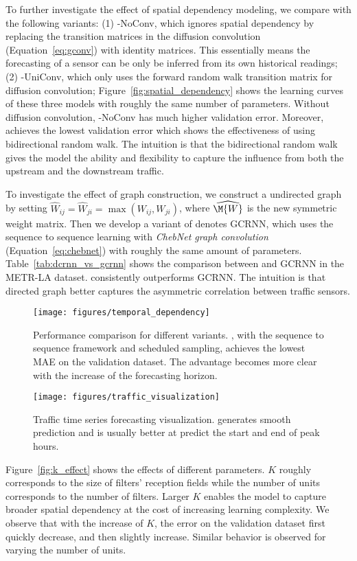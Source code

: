 To further investigate the effect of spatial dependency modeling, we compare \gcrnn{} with the following variants:
(1) \gcrnn{}-NoConv, which ignores spatial dependency by replacing the transition matrices in the diffusion convolution (Equation~\ref{eq:gconv}) with identity matrices. This essentially means the forecasting of a sensor can be only be inferred from its own historical readings;
(2) \gcrnn{}-UniConv, which only uses the forward random walk transition matrix for diffusion convolution;
Figure~\ref{fig:spatial_dependency} shows the learning curves of these three models with roughly the same number of parameters.
Without diffusion convolution, \gcrnn{}-NoConv has much higher validation error. Moreover, \gcrnn{} achieves the lowest validation error which shows the effectiveness of using bidirectional random walk.
The intuition is that the bidirectional random walk gives the model the ability and flexibility to capture the influence from both the upstream and the downstream traffic.

To investigate the effect of graph construction, we construct a undirected graph by setting $\widehat{W}_{ij} = \widehat{W}_{ji} = \max(W_{ij}, W_{ji})$, where $\widehat{\M{W}}$ is the new symmetric weight matrix.
Then we develop a variant of \gcrnn{} denotes GCRNN, which uses the sequence to sequence learning with \emph{ChebNet graph convolution} (Equation~\ref{eq:chebnet}) with roughly the same amount of parameters.
Table~\ref{tab:dcrnn_vs_gcrnn} shows the comparison between \gcrnn{} and GCRNN in the METR-LA dataset.
\gcrnn{} consistently outperforms GCRNN. The intuition is that directed graph better captures the asymmetric correlation between traffic sensors.  
\begin{figure*}[tp]
    \centering
	\begin{minipage}{.43\textwidth}
	\centering
\texttt{[image: figures/temporal\_dependency]}
    \caption{Performance comparison for different \gcrnn{} variants. \gcrnn{}, with the sequence to sequence framework and scheduled sampling, achieves the lowest MAE on the validation dataset. The advantage becomes more clear with the increase of the forecasting horizon.}
    \label{fig:seq2seq_comparison}
	\end{minipage}
\hspace{0.01\textwidth}
	\begin{minipage}{.52\textwidth}
	\centering
\texttt{[image: figures/traffic\_visualization]}
\caption{Traffic time series forecasting visualization. \gcrnn{} generates smooth prediction and is usually better at predict the start and end of peak hours.}
	\label{fig:traffic_visualization}
	\end{minipage} 
\end{figure*}
Figure~\ref{fig:k_effect} shows the effects of different parameters. 
$K$ roughly corresponds to the size of filters' reception fields while the number of units corresponds to the number of filters. 
Larger $K$ enables the model to capture broader spatial dependency at the cost of increasing learning complexity. We observe that with the increase of $K$, the error on the validation dataset first quickly decrease, and then slightly increase.
Similar behavior is observed for varying the number of units.
\vspace{-0.1in}
